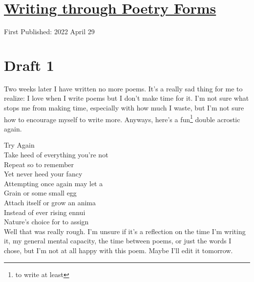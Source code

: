 \documentclass[12pt]{article}[titlepage]
\newcommand{\1}{\={a}}
\newcommand{\2}{\={e}}
\newcommand{\3}{\={\i}}
\newcommand{\4}{\=o}
\newcommand{\5}{\=u}
\newcommand{\6}{\={A}}
\renewcommand{\,}{\textsuperscript{,}}
\begin{document}
\doublespacing
\section{\href{poetry-forms-4.html}{Writing through Poetry Forms}}
First Published: 2022 April 29


\section{Draft 1}
Two weeks later I have written no more poems.
It's a really sad thing for me to realize: I love when I write poems but I don't make time for it.
I'm not sure what stops me from making time, especially with how much I waste, but I'm not sure how to encourage myself to write more.
Anyways, here's a fun\footnote{to write at least} double acrostic again.

Try Again\\
Take heed of everything you're not\\
Repeat so to remember \\
Yet never heed your fancy\\

Attempting once again may let a\\
Grain or some small egg\\
Attach itself or grow an anima\\
Instead of ever rising ennui\\
Nature's choice for to assign\\

Well that was really rough.
I'm unsure if it's a reflection on the time I'm writing it, my general mental capacity, the time between poems, or just the words I chose, but I'm not at all happy with this poem.
Maybe I'll edit it tomorrow.
\end{document}
